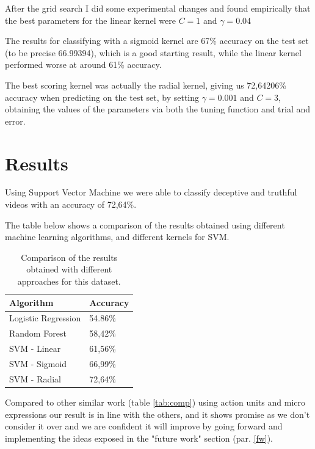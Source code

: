 After the grid search I did some experimental changes and found empirically that the best parameters for the linear kernel were $C = 1$ and $\gamma = 0.04$

The results for classifying with a sigmoid kernel are 67\% accuracy on the test set (to be precise 66.99394), which is a good starting result, while the linear kernel performed worse at around 61\% accuracy.

The best scoring kernel was actually the radial kernel, giving us 72,64206\% accuracy when predicting on the test set, by setting $\gamma  = 0.001$ and $C = 3$, obtaining the values of the parameters via both the tuning function and trial and error.

\clearpage

\section{Results} \label{results}
Using Support Vector Machine we were able to classify deceptive and truthful videos with an accuracy of 72,64\%.

The table below shows a comparison of the results obtained using different machine learning algorithms, and different kernels for SVM.

\begin{table}[H]
	\centering
	\begin{tabular}{|l|l|}
		\hline
		\textbf{Algorithm}  & \textbf{Accuracy} \\ \hline
		Logistic Regression & 54.86\%             \\ \hline
		Random Forest       & 58,42\%             \\ \hline
		SVM - Linear        & 61,56\%             \\ \hline
		SVM - Sigmoid        & 66,99\%             \\ \hline
		SVM - Radial       & 72,64\%             \\ \hline
	\end{tabular}
	\caption{Comparison of the results obtained with different approaches for this dataset.}
\end{table}

Compared to other similar work (table \ref{tab:comp}) using action units and micro expressions our result is in line with the others, and it shows promise as we don't consider it over and we are confident it will improve by going forward and implementing the ideas exposed in the "future work" section (par. \ref{fw}). 

